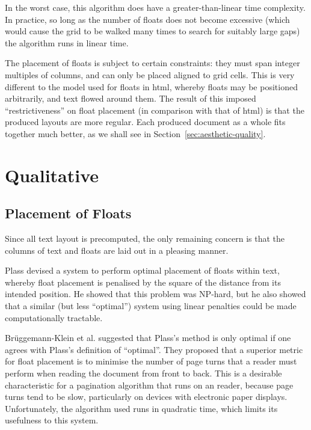 In the worst case, this algorithm does have a greater-than-linear time complexity. In practice, so long as the number of floats does not become excessive (which would cause the grid to be walked many times to search for suitably large gaps) the algorithm runs in linear time.

The placement of floats is subject to certain constraints: they must span integer multiples of columns, and can only be placed aligned to grid cells. This is very different to the model used for floats in \gls{html}, whereby floats may be positioned arbitrarily, and text flowed around them. The result of this imposed ``restrictiveness'' on float placement (in comparison with that of \gls{html}) is that the produced layouts are more regular. Each produced document as a whole fits together much better, as we shall see in Section~\ref{sec:aesthetic-quality}.


\section{Qualitative}
\label{sec:aesthetics}

\subsection{Placement of Floats}
Since all text layout is precomputed, the only remaining concern is that the columns of text and floats are laid out in a pleasing manner.

Plass\hspace{0pt}\cite{Plass1981} devised a system to perform optimal placement of floats within text, whereby float placement is penalised by the square of the distance from its intended position. He showed that this problem was NP-hard, but he also showed that a similar (but less ``optimal'') system using linear penalties could be made computationally tractable.

Br\"uggemann-Klein et al.\hspace{0pt}\cite{Bruggemann-Klein1995} suggested that Plass's method is only optimal if one agrees with Plass's definition of ``optimal''. They proposed that a superior metric for float placement is to minimise the number of page turns that a reader must perform when reading the document from front to back. This is a desirable characteristic for a pagination algorithm that runs on an \ebook{} reader, because page turns tend to be slow, particularly on devices with electronic paper displays. Unfortunately, the algorithm used runs in quadratic time, which limits its usefulness to this system.

